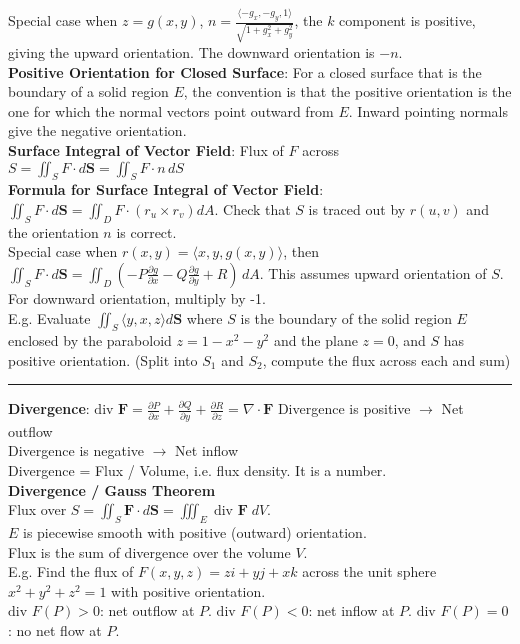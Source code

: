 \documentclass{article}
\begin{document}
{\begin{multicols*}{3}
Special case when $z=g(x,y)$, $n=\frac{\langle -g_x, -g_y ,1\rangle}{\sqrt{1+g_x^2+g_y^2}}$, the $k$ component is positive, giving the upward orientation. The downward orientation is $-n$.\\
\textbf{Positive Orientation for Closed Surface}: For a closed surface that is the boundary of a solid region $E$, the convention is that the positive orientation is the one for which the normal vectors point outward from $E$. Inward pointing normals give the negative orientation. \\
\textbf{Surface Integral of Vector Field}: Flux of $F$ across $S=\iint_S F\cdot d\mathbf{S}=\iint_SF\cdot n\,dS$ \\
\textbf{Formula for Surface Integral of Vector Field}: $\iint_SF\cdot d\mathbf{S}=\iint_DF\cdot (r_u\times r_v)dA$. Check that $S$ is traced out by $r(u,v)$ and the orientation $n$ is correct.\\
Special case when $r(x,y)=\langle x,y,g(x,y)\rangle$, then $\iint_S F\cdot d\mathbf{S}=\iint_D(-P\frac{\partial g}{\partial x}-Q\frac{\partial g}{\partial y}+R) \,dA$. This assumes upward orientation of $S$. For downward orientation, multiply by -1.\\
E.g. Evaluate $\iint_S\langle y,x,z\rangle d\mathbf{S}$ where $S$ is the boundary of the solid region $E$ enclosed by the paraboloid $z=1-x^2-y^2$ and the plane $z=0$, and $S$ has positive orientation. (Split into $S_1$ and $S_2$, compute the flux across each and sum)\\
\rule{193pt}{0.2pt}
\textbf{Divergence}: $\text{div }\mathbf{F}=\frac{\partial P}{\partial x}+\frac{\partial Q}{\partial y}+\frac{\partial R}{\partial z}=\nabla\cdot\mathbf{F}$
Divergence is positive $\to$ Net outflow\\
Divergence is negative $\to$ Net inflow\\
Divergence = Flux / Volume, i.e. flux density. It is a number.\\
\textbf{Divergence / Gauss Theorem}\\
Flux over $S=\iint_S\mathbf{F}\cdot d\mathbf{S}=\iiint_E\;\text{div }\mathbf{F}\;dV$. \\
$E$ is piecewise smooth with positive (outward) orientation. \\
Flux is the sum of divergence over the volume $V$. \\
E.g. Find the flux of $F(x,y,z)=zi+yj+xk$ across the unit sphere $x^2+y^2+z^2=1$ with positive orientation.\\
$\text{div }F(P)>0$: net outflow at $P$. $\text{div }F(P)<0$: net inflow at $P$. $\text{div }F(P)=0$: no net flow at $P$.\\

\end{multicols*}}
\end{document}
